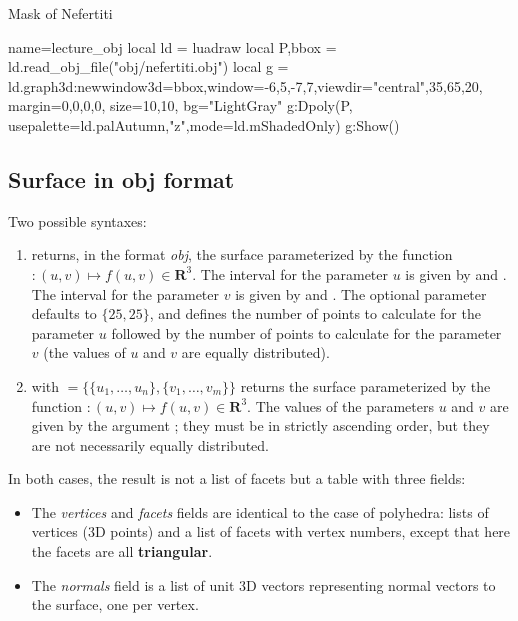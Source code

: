\begin{demo}{Mask of Nefertiti}
\begin{luadraw}{name=lecture_obj}
local ld = luadraw
local P,bbox = ld.read_obj_file("obj/nefertiti.obj")
local g = ld.graph3d:new{window3d=bbox,window={-6,5,-7,7},viewdir={"central",35,65,20},
margin={0,0,0,0}, size={10,10}, bg="LightGray"}
g:Dpoly(P, {usepalette={ld.palAutumn,"z"},mode=ld.mShadedOnly})
g:Show()
\end{luadraw}
\end{demo}

\subsection{Surface in obj format}

Two possible syntaxes:
\begin{enumerate}
    \item {} returns, in the format \emph{obj}, the surface parameterized by the function $\colon(u,v) \mapsto f(u,v)\in \mathbf R^3$. The interval for the parameter $u$ is given by  and . The interval for the parameter $v$ is given by  and . The optional parameter  defaults to $\{25,25\}$, and defines the number of points to calculate for the parameter $u$ followed by the number of points to calculate for the parameter $v$ (the values ​​of $u$ and $v$ are equally distributed).

    \item {} with $=\{\{u_1,\ldots,u_n\}, \{v_1,\ldots,v_m\}\}$ returns the surface parameterized by the function $\colon(u,v) \mapsto f(u,v)\in \mathbf R^3$. The values ​​of the parameters $u$ and $v$ are given by the argument ; they must be in strictly ascending order, but they are not necessarily equally distributed.
\end{enumerate}

In both cases, the result is not a list of facets but a table with three fields:
\begin{itemize}
    \item The \emph{vertices} and \emph{facets} fields are identical to the case of polyhedra: lists of vertices (3D points) and a list of facets with vertex numbers, except that here the facets are all \textbf{triangular}.

    \item The \emph{normals} field is a list of unit 3D vectors representing normal vectors to the surface, one per vertex.
\end{itemize}


